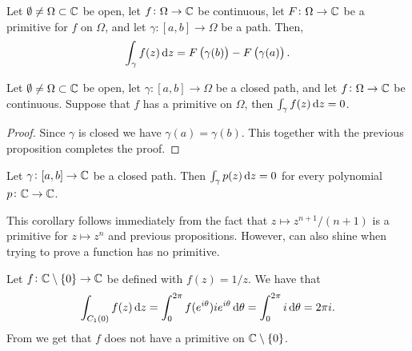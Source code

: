 \documentclass[11pt,a4paper]{article}
\begin{document}
\begin{proposition}
  Let $\emptyset \neq \Omega \subset \mathbb{C}$ be open,
  let $f \colon \Omega \to \mathbb{C}$ be continuous,
  let $F \colon \Omega \to \mathbb{C}$ be a primitive for $f$ on $\Omega$,
  and let $\gamma \colon [a, b] \to \Omega$ be a path. Then,
  \[
    \int_{\gamma} f(z) \dz =
    F\del{\gamma(b)} - F\del{\gamma(a)}.
  \]
\end{proposition}

\begin{corollary}
  \label{cor:zero-int}
  Let $\emptyset \neq \Omega \subset \mathbb{C}$ be open,
  let $\gamma \colon [a, b] \to \Omega$ be a closed path,
  and let $f \colon \Omega \to \mathbb{C}$ be continuous.
  Suppose that $f$ has a primitive on $\Omega$,
  then $\int_{\gamma} f(z) \dz = 0$.
\end{corollary}
\begin{proof}
  Since $\gamma$ is closed we have $\gamma(a) = \gamma(b)$.
  This together with the previous proposition completes the proof.
\end{proof}

\begin{corollary}
  Let $\gamma \colon [a, b] \to \mathbb{C}$ be a closed path.
  Then $\int_{\gamma} p(z) \dz = 0$ for every polynomial $p \colon \mathbb{C} \to \mathbb{C}$.
\end{corollary}

This corollary follows immediately from the fact that
$z \mapsto z^{n+1} / (n+1)$ is a primitive for $z \mapsto z^n$ and previous
propositions.
However,  can also shine when trying to prove a function
has no primitive.

\begin{example}
  Let $f \colon \mathbb{C} \setminus \set{0} \to \mathbb{C}$ be defined with $f(z) = 1 / z$.
  We have that
  \[
    \int_{C_1(0)} f(z) \dz =
    \int_{0}^{2 \pi} f(e^{i \theta}) i e^{i \theta} \dtheta =
    \int_{0}^{2 \pi} i \dtheta = 2 \pi i.
  \]
  From  we get that $f$ does not have a primitive on
  $\mathbb{C} \setminus \set{0}$.
\end{example}
\end{document}
